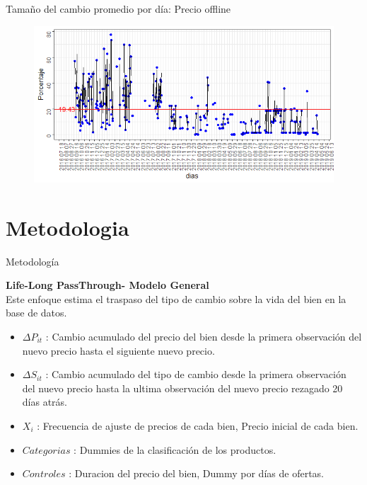 \documentclass[xcolor=dvipsnames]{beamer}
\begin{document}
\begin{frame}
Tamaño del cambio promedio por d\'ia: Precio offline
\begin{figure}
\includegraphics[scale=0.60]{tamano_cambio_promedio_normal.png}
\end{figure}
\end{frame}

\section{Metodologia}
\begin{frame}
Metodolog\'ia
\end{frame}
\begin{frame}
\textbf{Life-Long PassThrough- Modelo General}\\
Este enfoque estima el traspaso del tipo de cambio sobre la vida del bien en la base de datos.\\
\begin{itemize}
	\item $\Delta P_{it}$ : Cambio acumulado del precio del bien desde la primera observaci\'on del nuevo precio hasta el siguiente nuevo precio.
	\item $\Delta S_{it}$ : Cambio acumulado del tipo de cambio desde la primera observaci\'on del nuevo precio hasta la ultima observaci\'on del nuevo precio rezagado 20 d\'ias atr\'as.
	\item $X_{i}$ : Frecuencia de ajuste de precios de cada bien, Precio inicial de cada bien.
	\item $Categorias$ : Dummies de la clasificaci\'on de los productos.
	\item $Controles$ : Duracion del precio del bien, Dummy por d\'ias de ofertas.
\end{itemize}
\end{frame}
\end{document}
